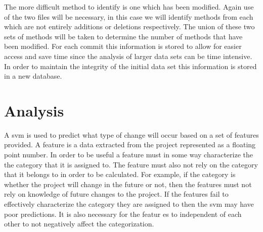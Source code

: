 
The more difficult method to identify is one which has been modified. Again use of the two files will be necessary, in this case we will identify methods from each which are not entirely additions or deletions respectively. The union of these two sets of methods will be taken to determine the number of methods that have been modified. For each commit this information is stored to allow for easier access and save time since the analysis of larger data sets can be time intensive. In order to maintain the integrity of the initial data set this information is stored in a new database.



\section{Analysis}
\label{sec:analysis}

A \gls{svm} is used to predict what type of change will occur based on a set of features provided. A feature is a data extracted from the project represented as a floating point number. In order to be useful a feature must in some way characterize the the category that it is assigned to. The feature must also not rely on the category that it belongs to in order to be calculated. For example, if the category is whether the project will change in the future or not, then the features must not rely on knowledge of future changes to the project. If the features fail to effectively characterize the category they are assigned to then the \gls{svm} may have poor predictions. It is also necessary for the featur  es to independent of each other to not negatively affect the categorization.


        

